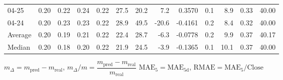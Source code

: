 \begin{threeparttable}
{\begin{tabular}{lrrrrrrrrrrrr}
  04-25 &          0.20 &          0.22 &          0.24 &        0.22 &                27.5 &                20.2 &        7.2 &       0.3570 &                 0.1 &              8.9 &            0.33 &                  40.00 \\
  04-24 &          0.20 &          0.23 &          0.23 &        0.22 &                28.9 &                49.5 &      -20.6 &      -0.4161 &                 0.2 &              8.4 &            0.32 &                  40.00 \\
Average &          0.20 &          0.19 &          0.21 &        0.22 &                22.4 &                28.7 &       -6.3 &      -0.0778 &                 0.2 &              9.9 &            0.37 &                  40.17 \\
 Median &          0.20 &          0.18 &          0.20 &        0.22 &                21.9 &                24.5 &       -3.9 &      -0.1365 &                 0.1 &             10.1 &            0.37 &                  40.00 \\
\bottomrule
\end{tabular}
}
\begin{tablenotes}\footnotesize
\item $m_\Delta=m_{\text{pred}}-m_{\text{real}}$,
$m_\Delta/m=\dfrac{m_{\text{pred}}-m_{\text{real}}}{m_{\text{real}}}$
$\mathrm{MAE}_5=\mathrm{MAE}_{5\text{d}}$,
$\mathrm{RMAE}=\mathrm{MAE}_5/\text{Close}$
\end{tablenotes}
\end{threeparttable}
\endgroup

